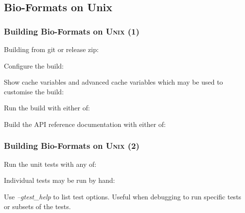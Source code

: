 \documentclass{beamer}
\newcommand{\opt}[1]{\textsl{#1}}
\begin{document}
\subsection{Bio-Formats on Unix}

\begin{frame}[fragile]
  \frametitle{Building Bio-Formats on U\textsc{nix} (1)}
  \scriptsize
  Building from git or release zip:

  Configure the build:

  \begin{semiverbatim}
\end{semiverbatim}

  Show cache variables and advanced cache variables which may be used to customise the build:

  \begin{semiverbatim}
\end{semiverbatim}

Run the build with either of:

  \begin{semiverbatim}
\end{semiverbatim}

Build the API reference documentation with either of:

  \begin{semiverbatim}
\end{semiverbatim}
\end{frame}

\begin{frame}[fragile]
  \frametitle{Building Bio-Formats on U\textsc{nix} (2)}
  \scriptsize

Run the unit tests with any of:

  \begin{semiverbatim}
\end{semiverbatim}

Individual tests may be run by hand:

  \begin{semiverbatim}
\end{semiverbatim}

Use \opt{--gtest\_help} to list test options.  Useful when debugging
to run specific tests or subsets of the tests.
\end{frame}
\end{document}
